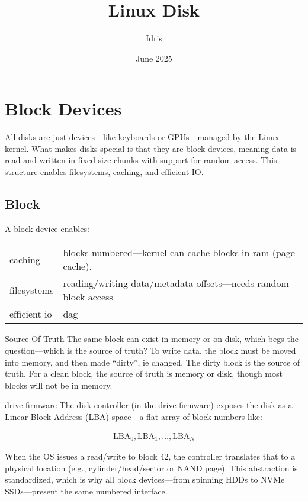 \documentclass[openany, 12pt]{book}
\title{Linux Disk}
\author{Idris}
\date{June 2025}
\begin{document}
\tableofcontents

\chapter{Block Devices}

All disks are just devices—like keyboards or GPUs—managed by the Linux kernel.
What makes disks special is that they are block devices, meaning data is read
and written in fixed-size chunks with support for random access. This structure
enables filesystems, caching, and efficient IO.\@

\section{Block}
A block device enables:

\begin{center}
	\begin{tabular}{ll}
		\toprule
		caching      & blocks numbered---kernel can cache blocks in ram (page cache).    \\
		filesystems  & reading/writing data/metadata offsets---needs random block access \\
		efficient io & dag                                                               \\
		\bottomrule
	\end{tabular}
\end{center}

\begin{definition}{Source Of Truth}{}
	The same block can exist in memory or on disk, which begs the question---which
	is the source of truth? To write data, the block must be moved into memory,
	and then made ``dirty'', ie changed.  The dirty block is the source of
	truth.  For a clean block, the source of truth is memory or disk, though
	most blocks will not be in memory.
\end{definition}

\begin{definition}{drive firmware}{}
	The disk controller (in the drive firmware) exposes the disk as a Linear
	Block Address (LBA) space—a flat array of block numbers like:

	\begin{align*}
		\text{LBA}_0, \text{LBA}_1, \ldots, \text{LBA}_N
	\end{align*}

	When the OS issues a read/write to block 42, the controller translates that
	to a physical location (e.g., cylinder/head/sector or NAND page). This
	abstraction is standardized, which is why all block devices—from spinning
	HDDs to NVMe SSDs—present the same numbered interface.
\end{definition}
\end{document}
